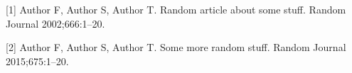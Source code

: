 \documentclass[11pt,report]{uncdissertation}
\begin{document}
\setlength{\parindent}{-0.2in} \setlength{\leftskip}{0.2in}
\setlength{\parskip}{8pt}


\hypertarget{refs}{}
\hypertarget{ref-article}{}
{[}1{]} Author F, Author S, Author T. Random article about some stuff.
Random Journal 2002;666:1--20.

\hypertarget{ref-articletwo}{}
{[}2{]} Author F, Author S, Author T. Some more random stuff. Random
Journal 2015;675:1--20.
\end{document}
